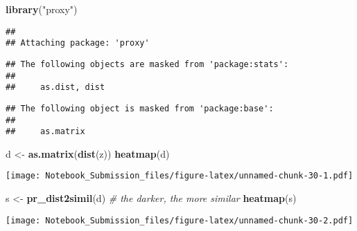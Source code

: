 \documentclass[
]{article}
\newenvironment{Shaded}{\begin{snugshade}}{\end{snugshade}}
\newcommand{\CommentTok}[1]{\textcolor[rgb]{0.56,0.35,0.01}{\textit{#1}}}
\newcommand{\DataTypeTok}[1]{\textcolor[rgb]{0.13,0.29,0.53}{#1}}
\newcommand{\DecValTok}[1]{\textcolor[rgb]{0.00,0.00,0.81}{#1}}
\newcommand{\KeywordTok}[1]{\textcolor[rgb]{0.13,0.29,0.53}{\textbf{#1}}}
\newcommand{\NormalTok}[1]{#1}
\newcommand{\OperatorTok}[1]{\textcolor[rgb]{0.81,0.36,0.00}{\textbf{#1}}}
\newcommand{\StringTok}[1]{\textcolor[rgb]{0.31,0.60,0.02}{#1}}
\begin{document}
\begin{Shaded}
\begin{Highlighting}[]
\KeywordTok{library}\NormalTok{(}\StringTok{"proxy"}\NormalTok{)}
\end{Highlighting}
\end{Shaded}

\begin{verbatim}
## 
## Attaching package: 'proxy'
\end{verbatim}

\begin{verbatim}
## The following objects are masked from 'package:stats':
## 
##     as.dist, dist
\end{verbatim}

\begin{verbatim}
## The following object is masked from 'package:base':
## 
##     as.matrix
\end{verbatim}

\begin{Shaded}
\begin{Highlighting}[]
\NormalTok{d <-}\StringTok{ }\KeywordTok{as.matrix}\NormalTok{(}\KeywordTok{dist}\NormalTok{(z))}
\KeywordTok{heatmap}\NormalTok{(d)}
\end{Highlighting}
\end{Shaded}

\texttt{[image: Notebook\_Submission\_files/figure-latex/unnamed-chunk-30-1.pdf]}

\begin{Shaded}
\begin{Highlighting}[]
\NormalTok{s <-}\StringTok{ }\KeywordTok{pr_dist2simil}\NormalTok{(d) }\CommentTok{# the darker, the more similar}
\KeywordTok{heatmap}\NormalTok{(s)}
\end{Highlighting}
\end{Shaded}

\texttt{[image: Notebook\_Submission\_files/figure-latex/unnamed-chunk-30-2.pdf]}

\begin{Shaded}
\end{Shaded}
\end{document}
